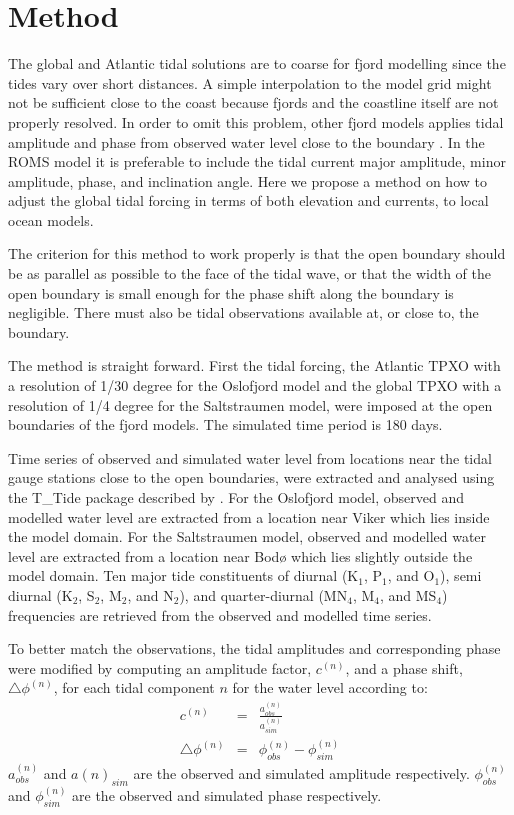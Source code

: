 \section{Method}

The global and Atlantic tidal solutions are to coarse for fjord modelling since the tides vary over short distances. A simple interpolation to the model grid might not be sufficient close to the coast because fjords and the coastline itself are not properly resolved. In order to omit this problem, other fjord models applies tidal amplitude and phase from observed water level close to the boundary \cite[i.e.]{svendsen96,lynge13}. In the ROMS model it is preferable to include the tidal current major amplitude, minor amplitude, phase, and inclination angle. Here we propose a method on how to adjust the global tidal forcing in terms of both elevation and currents, to local ocean models. 

The criterion for this method to work properly is that the open boundary should be as parallel as possible to the face of the tidal wave, or that the width of the open boundary is small enough for the phase shift along the boundary is negligible. There must also be tidal observations available at, or close to, the boundary.

The method is straight forward. First the tidal forcing, the Atlantic TPXO with a resolution of 1/30 degree for the Oslofjord model and the global TPXO with a resolution of 1/4 degree for the Saltstraumen model, were imposed at the open boundaries of the fjord models. The simulated time period is 180 days. 

Time series of observed and simulated water level from locations near the tidal gauge stations close to the open boundaries, were extracted and analysed using the T\_Tide package described by \cite{pawlowicz02}. For the Oslofjord model, observed and modelled water level are extracted from a location near Viker which lies inside the model domain. For the Saltstraumen model, observed and modelled water level are extracted from a location near Bod{\o} which lies slightly outside the model domain. Ten major tide constituents of diurnal (K$_1$, P$_1$, and O$_1$), semi diurnal (K$_2$, S$_2$, M$_2$, and N$_2$), and quarter-diurnal (MN$_4$, M$_4$, and MS$_4$) frequencies are retrieved from the observed and modelled time series. 

To better match the observations, the tidal amplitudes and corresponding phase were modified by computing an amplitude factor, $c^{(n)}$, and a phase shift, $\triangle \phi^{(n)}$, for each tidal component $n$ for the water level according to:
\begin{eqnarray}
c^{(n)} &=& \frac{a^{(n)}_{obs}}{a^{(n)}_{sim}} \\
\triangle \phi^{(n)} &=& \phi^{(n)}_{obs} - \phi^{(n)}_{sim}
\end{eqnarray}
$a^{(n)}_{obs}$ and $a{(n)}_{sim}$ are the observed and simulated amplitude respectively. $\phi^{(n)}_{obs}$ and $\phi^{(n)}_{sim}$ are the observed and simulated phase respectively. 

